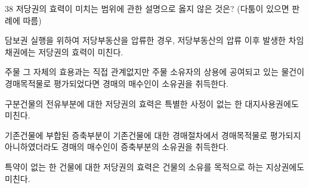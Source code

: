 \begin{question}{38}
저당권의 효력이 미치는 범위에 관한 설명으로 옳지 않은 것은? (다툼이 있으면 판례에 따름)
\begin{choices}
  \item 담보권 실행을 위하여 저당부동산을 압류한 경우, 저당부동산의 압류 이후 발생한 차임채권에는 저당권의 효력이 미친다.
  \item 주물 그 자체의 효용과는 직접 관계없지만 주물 소유자의 상용에 공여되고 있는 물건이 경매목적물로 평가되었다면 경매의 매수인이 소유권을 취득한다.
  \item 구분건물의 전유부분에 대한 저당권의 효력은 특별한 사정이 없는 한 대지사용권에도 미친다.
  \item 기존건물에 부합된 증축부분이 기존건물에 대한 경매절차에서 경매목적물로 평가되지 아니하였더라도 경매의 매수인이 증축부분의 소유권을 취득한다.
  \item 특약이 없는 한 건물에 대한 저당권의 효력은 건물의 소유를 목적으로 하는 지상권에도 미친다.
\end{choices}
\end{question}
